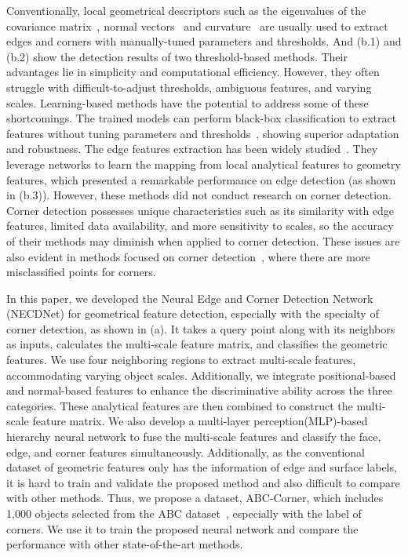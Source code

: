 \documentclass[lettersize,journal]{IEEEtran}
\begin{document}
Conventionally, local geometrical descriptors such as the eigenvalues of the covariance matrix~\cite{gumhold_feature_2001}, normal vectors~\cite{demarsin_detection_2007} and curvature~\cite{lin_line_2015} are usually used to extract edges and corners with manually-tuned parameters and thresholds. And (b.1) and (b.2) show the detection results of two threshold-based methods. Their advantages lie in simplicity and computational efficiency. However, they often struggle with difficult-to-adjust thresholds, ambiguous features, and varying scales.
Learning-based methods have the potential to address some of these shortcomings. The trained models can perform black-box classification to extract features without tuning parameters and thresholds~\cite{qi_pointnet_2017, bazazian_edcnet_2021}, showing superior adaptation and robustness. The edge features extraction has been widely studied~\cite{himeur_pcednet_2022, bode_bounded_2023}. They leverage networks to learn the mapping from local analytical features to geometry features, which presented a remarkable performance on edge detection (as shown in (b.3)). However, these methods did not conduct research on corner detection. Corner detection possesses unique characteristics such as its similarity with edge features, limited data availability, and more sensitivity to scales, so the accuracy of their methods may diminish when applied to corner detection. These issues are also evident in methods focused on corner detection~\cite{wang_pienet_2020a}, where there are more misclassified points for corners.

In this paper, we developed the Neural Edge and Corner Detection Network (NECDNet) for geometrical feature detection, especially with the specialty of corner detection, as shown in (a). It takes a query point along with its neighbors as inputs, calculates the multi-scale feature matrix, and classifies the geometric features.
We use four neighboring regions to extract multi-scale features, accommodating varying object scales. Additionally, we integrate positional-based and normal-based features to enhance the discriminative ability across the three categories. These analytical features are then combined to construct the multi-scale feature matrix. We also develop a multi-layer perception(MLP)-based hierarchy neural network to fuse the multi-scale features and classify the face, edge, and corner features simultaneously.
Additionally, as the conventional dataset of geometric features only has the information of edge and surface labels, it is hard to train and validate the proposed method and also difficult to compare with other methods. Thus, we propose a dataset, ABC-Corner, which includes 1,000 objects selected from the ABC dataset~\cite{koch_abc_2019}, especially with the label of corners. We use it to train the proposed neural network and compare the performance with other state-of-the-art methods.
\end{document}
